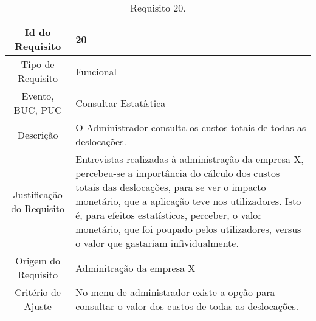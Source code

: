 \begin{table}[H]
\begin{center}
  \begin{tabularx}{\textwidth}{ | c | X | }
    \hline
    Id do Requisito & 20  \\
    
    \hline
    Tipo de Requisito & Funcional \\
    
    \hline
    Evento, BUC, PUC &  Consultar Estatística\\
    
    \hline
    Descrição & O Administrador consulta os custos totais de todas as deslocações.\\
    
    \hline
    Justificação do Requisito & Entrevistas realizadas à administração da empresa X, percebeu-se a importância do cálculo dos custos totais das deslocações, para se ver o impacto monetário, que a aplicação teve nos utilizadores. Isto é, para efeitos estatísticos, perceber, o valor monetário, que foi poupado pelos utilizadores, versus o valor que gastariam infividualmente. \\
    
    \hline
    Origem do Requisito & Adminitração da empresa X\\
    
    \hline
    Critério de Ajuste & No menu de administrador existe a opção para consultar o valor dos custos de todas as deslocações.  \\
    
    \hline
  \end{tabularx}
  \caption{Requisito 20.} \label{tab:r3}
\end{center}
\end{table}

